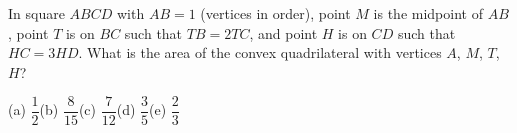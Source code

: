 In square $ABCD$ with $AB=1$ (vertices in order), point $M$ is the midpoint of $AB$, point $T$ is on $BC$ such that $TB=2TC$, and point $H$ is on $CD$ such that $HC=3HD$. What is the area of the convex quadrilateral with vertices $A$, $M$, $T$, $H$?

(a) $\dfrac{1}{2}$\quad (b) $\dfrac{8}{15}$\quad (c) $\dfrac{7}{12}$\quad (d) $\dfrac{3}{5}$\quad (e) $\dfrac{2}{3}$
